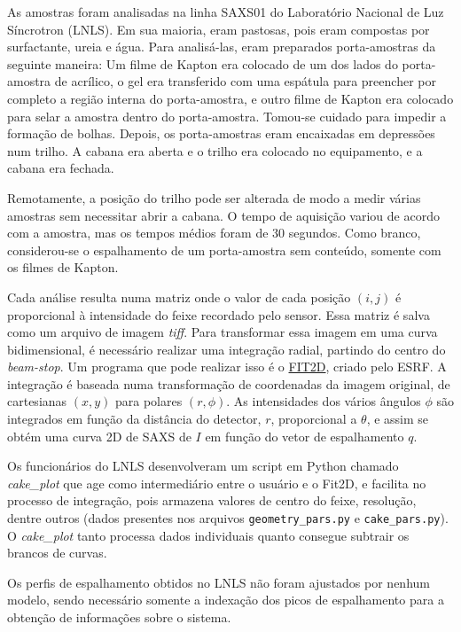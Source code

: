 			As amostras foram analisadas na linha SAXS01 do Laboratório Nacional de Luz Síncrotron (LNLS). Em sua maioria, eram pastosas, pois eram compostas por surfactante, ureia e água. Para analisá-las, eram preparados porta-amostras da seguinte maneira: Um filme de Kapton era colocado de um dos lados do porta-amostra de acrílico, o gel era transferido com uma espátula para preencher por completo a região interna do porta-amostra, e outro filme de Kapton era colocado para selar a amostra dentro do porta-amostra. Tomou-se cuidado para impedir a formação de bolhas. Depois, os porta-amostras eram encaixadas em depressões num trilho. A cabana era aberta e o trilho era colocado no equipamento, e a cabana era fechada. %
					
			Remotamente, a posição do trilho pode ser alterada de modo a medir várias amostras sem necessitar abrir a cabana. O tempo de aquisição variou de acordo com a amostra, mas os tempos médios foram de 30 segundos. Como branco, considerou-se o espalhamento de um porta-amostra sem conteúdo, somente com os filmes de Kapton.
			
			Cada análise resulta numa matriz onde o valor de cada posição $(i, j)$ é proporcional à intensidade do feixe recordado pelo sensor. Essa matriz é salva como um arquivo de imagem \emph{tiff}. Para transformar essa imagem em uma curva bidimensional, é necessário realizar uma integração radial, partindo do centro do \emph{beam-stop}. Um programa que pode realizar isso é o \href{http://www.esrf.eu/computing/scientific/FIT2D/windows.html}{FIT2D}, criado pelo ESRF. A integração é baseada numa transformação de coordenadas da imagem original, de cartesianas $(x, y)$ para polares $(r, \phi)$. As intensidades dos vários ângulos $\phi$ são integrados em função da distância do detector, $r$, proporcional a $\theta$, e assim se obtém uma curva 2D de SAXS de $I$ em função do vetor de espalhamento $q$. 
			
			Os funcionários do LNLS desenvolveram um script em Python chamado \emph{cake\_plot} que age como intermediário entre o usuário e o Fit2D, e facilita no processo de integração, pois armazena valores de centro do feixe, resolução, dentre outros (dados presentes nos arquivos \texttt{geometry\_pars.py} e \texttt{cake\_pars.py}). O \emph{cake\_plot} tanto processa dados individuais quanto consegue subtrair os brancos de curvas.
			
			Os perfis de espalhamento obtidos no LNLS não foram ajustados por nenhum modelo, sendo necessário somente a indexação dos picos de espalhamento para a obtenção de informações sobre o sistema.		
			
